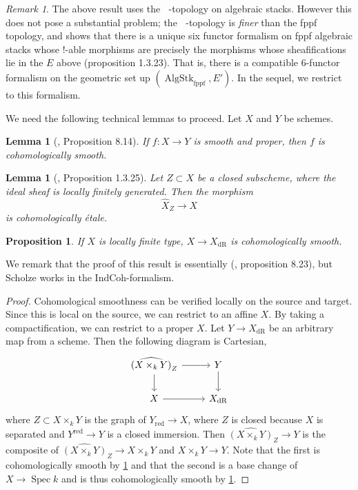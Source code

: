 \documentclass{article}
\newtheorem{lemma}[theorem]{Lemma}
\newtheorem{proposition}[theorem]{Proposition}
\theoremstyle{definition}
\theoremstyle{remark}
\newtheorem{remark}[theorem]{Remark}
\DeclareMathOperator{\spec}{Spec}
\DeclareMathOperator{\dr}{dR}
\DeclareMathOperator{\red}{red}
\DeclareMathOperator{\dqc}{D_{qc}}
\DeclareMathOperator{\algstk}{AlgStk}
\begin{document}
\begin{remark}
The above result uses the $\dqc$-topology on algebraic stacks. However this does not pose a substantial problem; the $\dqc$-topology is \emph{finer} than the fppf topology, and \cite{Rib24} shows that there is a unique six functor formalism on fppf algebraic stacks whose $!$-able morphisms are precisely the morphisms whose sheafifications lie in the $E$ above (proposition 1.3.23). That is, there is a compatible 6-functor formalism on the geometric set up $(\algstk_{\text{fppf}}, E')$. In the sequel, we restrict to this formalism.
\end{remark}

We need the following technical lemmas to proceed. Let $X$ and $Y$ be schemes.

\begin{lemma}[\cite{Sch22}, Proposition 8.14]\label{proper=smooth} If $f: X \to Y$ is smooth and proper, then $f$ is cohomologically smooth.
\end{lemma}

\begin{lemma}[\cite{Rib24}, Proposition 1.3.25]\label{closed=smooth} Let $Z \subset X$ be a closed subscheme, where the ideal sheaf is locally finitely generated. Then the morphism
$$ \widehat{X}_Z \to X$$
is cohomologically étale.
\end{lemma}

\begin{proposition}\label{coh-smooth} If $X$ is locally finite type, $X \to X_{\dr}$ is cohomologically smooth.
\end{proposition}

We remark that the proof of this result is essentially (\cite{Sch22}, proposition 8.23), but Scholze works in the IndCoh-formalism.

\begin{proof} Cohomological smoothness can be verified locally on the source and target. Since this is local on the source, we can restrict to an affine $X$. By taking a compactification, we can restrict to a proper $X$. Let $Y \to X_{\dr}$ be an arbitrary map from a scheme. Then the following diagram is Cartesian, 
\[\begin{tikzcd}
  {\widehat{(X \times_k Y)}_{Z}} & Y \\
  X & {X_{\dr}}
  \arrow[from=1-1, to=1-2]
  \arrow[from=1-1, to=2-1]
  \arrow[from=1-2, to=2-2]
  \arrow[from=2-1, to=2-2]
\end{tikzcd}\]
where $Z \subset X \times_k Y$ is the graph of $Y_{\text{red}} \to X$, where $Z$ is closed because $X$ is separated and $Y^{\red} \to Y$ is a closed immersion. Then $\widehat{(X \times_k Y)}_{Z} \to Y$ is the composite of $\widehat{(X \times_k Y)}_{Z} \to X \times_k Y$ and $X \times_k Y \to Y$. Note that the first is cohomologically smooth by \ref{closed=smooth} and that the second is a base change of $X \to \spec k$ and is thus cohomologically smooth by \ref{proper=smooth}.
\end{proof}
\end{document}
